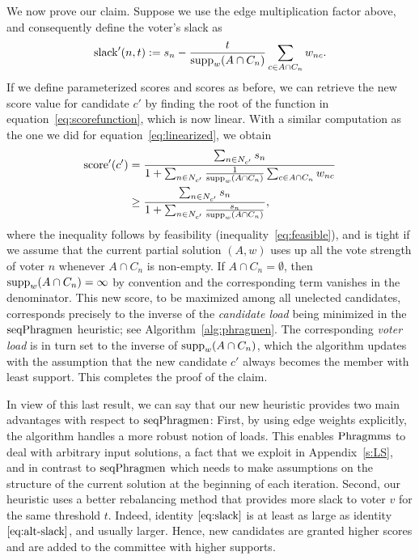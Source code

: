 We now prove our claim. Suppose we use the edge multiplication factor above, and consequently define the voter's slack as
\begin{align}\label{eq:alt-slack}
\operatorname{slack}'(n,t):=s_n - \frac{t}{\operatorname{supp}_w(A\cap C_n)}\sum_{c\in A\cap C_n} w_{nc}.
\end{align}
%
If we define parameterized scores and scores as before, we can retrieve the new score value for candidate $c'$ by finding the root of the function in equation~\eqref{eq:scorefunction}, which is now linear. 
With a similar computation as the one we did for equation~\eqref{eq:linearized}, we obtain
\begin{align*}
\operatorname{score}'(c') 
&=\frac{\sum_{n\in N_{c'}} s_n}{1+\sum_{n\in N_{c'}} \frac{1}{\operatorname{supp}_w(A\cap C_n)} \sum_{c\in A\cap C_n} w_{nc} } \\
&\geq  \frac{\sum_{n\in N_{c'}} s_n}{1+\sum_{n\in N_{c'}} \frac{s_n}{\operatorname{supp}_w(A\cap C_n)}}, 
\end{align*}
%
where the inequality follows by feasibility (inequality~\ref{eq:feasible}), and is tight if we assume that the current partial solution $(A,w)$ uses up all the vote strength of voter $n$ whenever $A\cap C_n$ is non-empty. If $A\cap C_n=\emptyset$, then $\operatorname{supp}_w(A\cap C_n)=\infty$ by convention and the corresponding term vanishes in the denominator. 
%
This new score, to be maximized among all unelected candidates, corresponds precisely to the inverse of the \emph{candidate load} being minimized in the $\operatorname{seqPhragmen}$ heuristic; see Algorithm~\ref{alg:phragmen}. The corresponding \emph{voter load} is in turn set to the inverse of $\operatorname{supp}_w(A\cap C_n)$, which the algorithm updates with the assumption that the new candidate $c'$ always becomes the member with least support. This completes the proof of the claim.

In view of this last result, we can say that our new heuristic provides two main advantages with respect to $\operatorname{seqPhragmen}$: 
First, by using edge weights explicitly, the algorithm handles a more robust notion of loads. 
This enables $\operatorname{Phragmms}$ to deal with arbitrary input solutions, a fact that we exploit in Appendix~\ref{s:LS}, and in contrast to $\operatorname{seqPhragmen}$ which needs to make assumptions on the structure of the current solution at the beginning of each iteration.  
Second, our heuristic uses a better rebalancing method that provides more slack to voter $v$ for the same threshold $t$. Indeed, identity $\eqref{eq:slack}$ is at least as large as identity $\eqref{eq:alt-slack}$, and usually larger. Hence, new candidates are granted higher scores and are added to the committee with higher supports.


